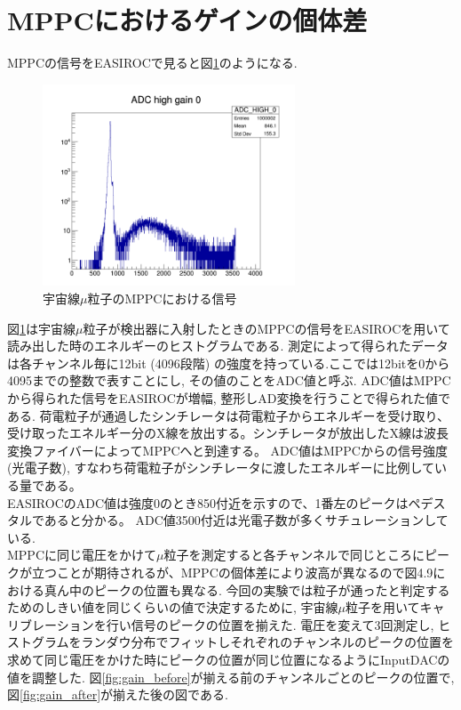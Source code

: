\section{MPPCにおけるゲインの個体差}
MPPCの信号をEASIROCで見ると図\ref{fig:mu_mppc}のようになる.
\begin{figure}[H]
    \centering
    \includegraphics[height=6cm]{img/mppc_gain.jpg}
    \caption{宇宙線$\mu$粒子のMPPCにおける信号}
    \label{fig:mu_mppc}
\end{figure}
図\ref{fig:mu_mppc}は宇宙線$\mu$粒子が検出器に入射したときのMPPCの信号をEASIROCを用いて読み出した時のエネルギーのヒストグラムである.
測定によって得られたデータは各チャンネル毎に12bit (4096段階) の強度を持っている.ここでは12bitを0から4095までの整数で表すことにし, その値のことをADC値と呼ぶ.
ADC値はMPPCから得られた信号をEASIROCが増幅, 整形しAD変換を行うことで得られた値である.
荷電粒子が通過したシンチレータは荷電粒子からエネルギーを受け取り、受け取ったエネルギー分のX線を放出する。シンチレータが放出したX線は波長変換ファイバーによってMPPCへと到達する。
ADC値はMPPCからの信号強度(光電子数), すなわち荷電粒子がシンチレータに渡したエネルギーに比例している量である。
\\
EASIROCのADC値は強度0のとき850付近を示すので、1番左のピークはペデスタルであると分かる。
ADC値3500付近は光電子数が多くサチュレーションしている.\\
MPPCに同じ電圧をかけて$\mu$粒子を測定すると各チャンネルで同じところにピークが立つことが期待されるが、MPPCの個体差により波高が異なるので図4.9における真ん中のピークの位置も異なる.
今回の実験では粒子が通ったと判定するためのしきい値を同じくらいの値で決定するために, 宇宙線$\mu$粒子を用いてキャリブレーションを行い信号のピークの位置を揃えた.
電圧を変えて3回測定し, ヒストグラムをランダウ分布でフィットしそれぞれのチャンネルのピークの位置を求めて同じ電圧をかけた時にピークの位置が同じ位置になるようにInputDACの値を調整した.
図\ref{fig:gain_before}が揃える前のチャンネルごとのピークの位置で, 図\ref{fig:gain_after}が揃えた後の図である.
